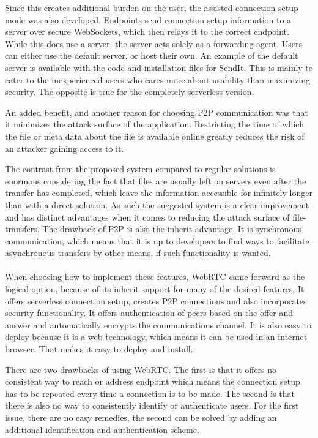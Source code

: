 Since this creates additional burden on the user, the assisted connection setup mode was also developed. Endpoints send connection setup information to a server over secure WebSockets, which then relays it to the correct endpoint. While this does use a server, the server acts solely as a forwarding agent. Users can either use the default server, or host their own. An example of the default server is available with the code and installation files for SendIt. This is mainly to cater to the inexperienced users who cares more about usability than maximizing security. The opposite is true for the completely serverless version.

An added benefit, and another reason for choosing P2P communication was that it minimizes the attack surface of the application. Restricting the time of which the file or meta data about the file is available online greatly reduces the risk of an attacker gaining access to it.

The contrast from the proposed system compared to regular solutions is enormous considering the fact that files are usually left on servers even after the transfer has completed, which leave the information accessible for infinitely longer than with a direct solution. As such the suggested system is a clear improvement and has distinct advantages when it comes to reducing the attack surface of file-transfers. The drawback of P2P is also the inherit advantage. It is synchronous communication, which means that it is up to developers to find ways to facilitate asynchronous transfers by other means, if such functionality is wanted.
%
\paragraph{}
%
When choosing how to implement these features, WebRTC came forward as the logical option, because of its inherit support for many of the desired features. It offers serverless connection setup, creates P2P connections and also incorporates security functionality.  It offers authentication of peers based on the offer and answer and automatically encrypts the communications channel. It is also easy to deploy because it is a web technology, which means it can be used in an internet browser. That makes it easy to deploy and install.

There are two drawbacks of using WebRTC. The first is that it offers no consistent way to reach or address endpoint which means the connection setup has to be repeated every time a connection is to be made. The second is that there is also no way to consistently identify or authenticate users. For the first issue, there are no easy remedies, the second can be solved by adding an additional identification and authentication scheme.
%
